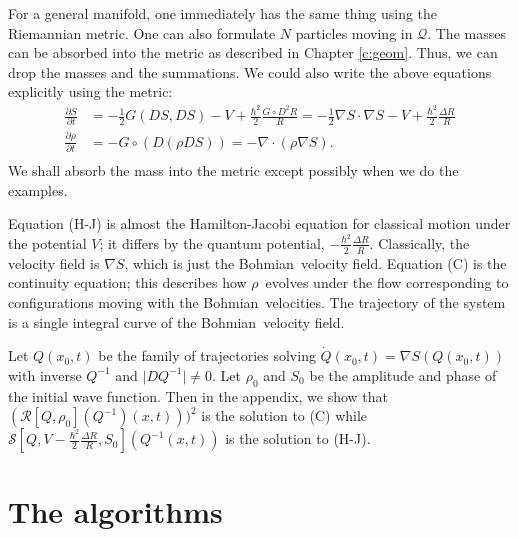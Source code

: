 \documentclass[11pt]{article}
\theoremstyle{remark}
\begin{document}
For a general manifold, one immediately has the same thing using the
Riemannian metric. One can also formulate $N$ particles moving in
\ensuremath{\mathcal{Q}}. The masses can be absorbed into the metric as described in
Chapter \ref{c:geom}. Thus, we can drop the masses and the
summations. We could also write the above equations explicitly using
the metric: 
\begin{align*}
\ensuremath{\frac{\partial {S}}{\partial {t}}} &= -\frac{1}{2}G(DS, DS)  - {V} + \frac{\ensuremath{\hbar}^2}{2}
\frac{G\circ D^2 R}{R} = - \frac{1}{2} \nabla S \cdot \nabla S - V + 
\tag{H-J}  \frac{\ensuremath{\hbar}^2}{2}
\frac{\ensuremath{\Delta} R}{R}
\\
\ensuremath{\frac{\partial {\ensuremath{\rho}}}{\partial {t}}} &= - G\circ(D(\ensuremath{\rho} DS)) = -\nabla \cdot (\ensuremath{\rho} \nabla S).
 \tag{C}
\\
\end{align*}
We shall absorb the mass into the metric except possibly when we do
the examples. 


Equation (H-J) is almost the Hamilton-Jacobi equation for classical motion
under the potential $V$; it differs by the  
 quantum potential,  
 $ -\frac{\ensuremath{\hbar}^2}{2}\frac{\ensuremath{\Delta} R}{R} $.
Classically, the velocity field is $\nabla S$, which is just the
Bohmian\
velocity field. Equation  
(C) is the continuity equation; this describes how \ensuremath{\rho}\
evolves under the flow corresponding to configurations
moving with the Bohmian\ velocities.  The trajectory of the system is a single
integral curve of the Bohmian\ 
velocity field.  

Let $Q(x_0,t)$ be the family of
trajectories solving $\dot{Q} (x_0,t)  = \nabla S (Q(x_0,t))$ 
with inverse $Q^{-1}$ and  $\ensuremath{\lvert {DQ^{-1}} \rvert} \neq 0$.  Let $\ensuremath{\rho}_0$ and
$S_0$ be the amplitude and phase of the initial wave function. Then in the
appendix, we show that $(\ensuremath{\mathcal{R}}[Q, \ensuremath{\rho}_0] (Q^{-1})(x,t)))^2$ is the solution
to (C) while $\ensuremath{\mathcal{S}}[Q, V -\frac{\ensuremath{\hbar}^2}{2}\frac{\ensuremath{\Delta} R}{R}, S_0]
(Q^{-1}(x,t))$ is the solution to (H-J). 


\section{The algorithms}
\end{document}
